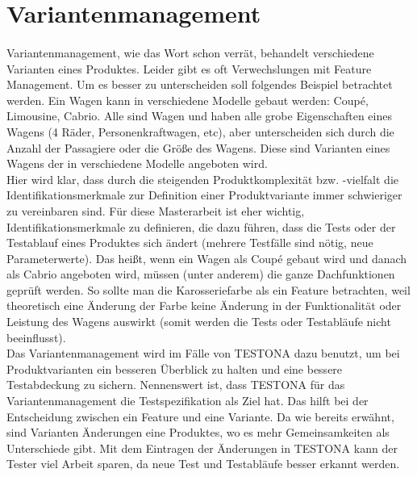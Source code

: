 \newpage
\section{Variantenmanagement}\label{sec:VarManag}
\paragraph{}

Variantenmanagement, wie das Wort schon verrät, behandelt verschiedene Varianten eines Produktes. Leider gibt es oft Verwechslungen mit Feature Management. Um es besser zu unterscheiden soll folgendes Beispiel betrachtet werden. Ein Wagen kann in verschiedene Modelle gebaut werden: Coup\'{e}, Limousine, Cabrio. Alle sind Wagen und haben alle grobe Eigenschaften eines Wagens (4 Räder, Personenkraftwagen, etc), aber unterscheiden sich durch die Anzahl der Passagiere oder die Größe des Wagens. Diese sind Varianten eines Wagens der in verschiedene Modelle angeboten wird. \cite{VarMan1} \\

Hier wird klar, dass durch die steigenden Produktkomplexität bzw. -vielfalt die Identifikationsmerkmale zur Definition einer Produktvariante immer schwieriger zu vereinbaren sind. Für diese Masterarbeit ist eher wichtig, Identifikationsmerkmale zu definieren, die dazu führen, dass die Tests oder der Testablauf eines Produktes sich ändert (mehrere Testfälle sind nötig, neue Parameterwerte). Das heißt, wenn ein Wagen als Coup\'{e} gebaut wird und danach als Cabrio angeboten wird, müssen (unter anderem) die ganze Dachfunktionen geprüft werden. So sollte man die Karosseriefarbe als ein Feature betrachten, weil theoretisch eine Änderung der Farbe keine Änderung in der Funktionalität oder Leistung des Wagens auswirkt (somit werden die Tests oder Testabläufe nicht beeinflusst). \cite{VarMan2}\\

Das Variantenmanagement wird im Fälle von TESTONA dazu benutzt, um bei Produktvarianten ein besseren Überblick zu halten und eine bessere Testabdeckung zu sichern. Nennenswert ist, dass TESTONA für das Variantenmanagement die Testspezifikation als Ziel hat. Das hilft bei der Entscheidung zwischen ein Feature und eine Variante. Da wie bereits erwähnt, sind Varianten Änderungen eine Produktes, wo es mehr Gemeinsamkeiten als Unterschiede gibt. Mit dem Eintragen der Änderungen in TESTONA kann der Tester viel Arbeit sparen, da neue Test und Testabläufe besser erkannt werden.\\


